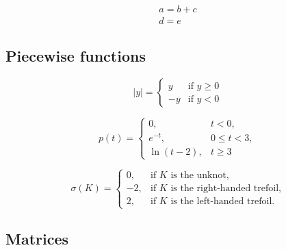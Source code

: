 \documentclass[11pt,a4paper]{article}
\theoremstyle{definition}                   %
\begin{document}
\begin{gather}
    a = b + c \\
    d = e
\end{gather}


\subsection{Piecewise functions}

\[
|y| = \begin{cases}
    y  & \text{if } y \geq 0 \\
    -y & \text{if } y < 0
\end{cases}
\]

\[
p(t) = \begin{cases}
    0,          & t < 0, \\
    e^{-t},     & 0 \le t < 3, \\
    \ln(t - 2), & t \ge 3
\end{cases}
\]

\begin{equation}
\sigma(K) = \begin{cases}
    0,  & \text{if } K \text{ is the unknot,} \\
    -2, & \text{if } K \text{ is the right-handed trefoil,} \\
    2,  & \text{if } K \text{ is the left-handed trefoil.}
\end{cases}
\label{eq:signature}
\end{equation}

\subsection{Matrices}
\end{document}
